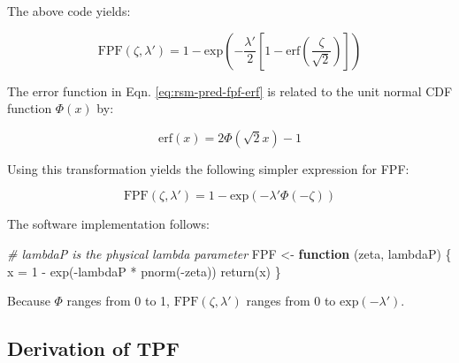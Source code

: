 \documentclass[
]{book}
\newenvironment{Shaded}{\begin{snugshade}}{\end{snugshade}}
\newcommand{\CommentTok}[1]{\textcolor[rgb]{0.56,0.35,0.01}{\textit{#1}}}
\newcommand{\ControlFlowTok}[1]{\textcolor[rgb]{0.13,0.29,0.53}{\textbf{#1}}}
\newcommand{\DecValTok}[1]{\textcolor[rgb]{0.00,0.00,0.81}{#1}}
\newcommand{\FunctionTok}[1]{\textcolor[rgb]{0.00,0.00,0.00}{#1}}
\newcommand{\NormalTok}[1]{#1}
\newcommand{\OtherTok}[1]{\textcolor[rgb]{0.56,0.35,0.01}{#1}}
\newcommand{\SpecialCharTok}[1]{\textcolor[rgb]{0.00,0.00,0.00}{#1}}
\begin{document}
The above code yields:

\begin{equation}
\text{FPF}\left (\zeta , \lambda'\right ) = 1 - \text{exp}\left ( -\frac{\lambda'}{2} \left [ 1-\text{erf}\left ( \frac{\zeta}{\sqrt{2}} \right ) \right ]  \right ) 
\label{eq:rsm-pred-fpf-erf}
\end{equation}

The error function in Eqn. \eqref{eq:rsm-pred-fpf-erf} is related to the unit normal CDF function \(\Phi(x)\) by:

\begin{equation}
\text{erf} \left (x \right ) =  2\Phi \left ( \sqrt{2} x\right ) - 1
\label{eq:rsm-pred-erf-phi-relation}
\end{equation}

Using this transformation yields the following simpler expression for FPF:

\begin{equation}
\text{FPF}\left (\zeta , \lambda'\right ) = 1 - \text{exp}\left ( -\lambda' \Phi\left ( -\zeta \right )  \right ) 
\label{eq:rsm-pred-fpf}
\end{equation}

The software implementation follows:

\begin{Shaded}
\begin{Highlighting}[]
\CommentTok{\# lambdaP is the physical lambda\textquotesingle{} parameter}
\NormalTok{FPF }\OtherTok{\textless{}{-}} \ControlFlowTok{function}\NormalTok{ (zeta, lambdaP) \{}
\NormalTok{  x }\OtherTok{=} \DecValTok{1} \SpecialCharTok{{-}} \FunctionTok{exp}\NormalTok{(}\SpecialCharTok{{-}}\NormalTok{lambdaP }\SpecialCharTok{*} \FunctionTok{pnorm}\NormalTok{(}\SpecialCharTok{{-}}\NormalTok{zeta))}
  \FunctionTok{return}\NormalTok{(x)}
\NormalTok{\}}
\end{Highlighting}
\end{Shaded}

Because \(\Phi\) ranges from 0 to 1, \(\text{FPF}\left (\zeta , \lambda'\right )\) ranges from 0 to \(\text{exp} \left ( -\lambda' \right )\).

\hypertarget{rsm-pred-roc-curve-tpf}{%
\subsection{Derivation of TPF}\label{rsm-pred-roc-curve-tpf}}
\end{document}
